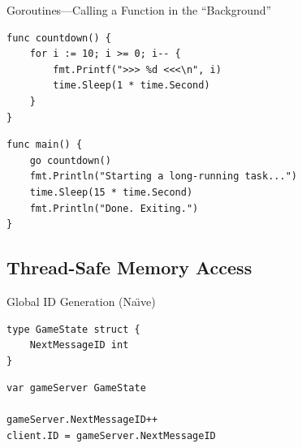 \documentclass[pdf]{beamer}
\begin{document}
\begin{frame}[fragile]{Goroutines---Calling a Function in the ``Background''}
\begin{lstlisting}
func countdown() {
    for i := 10; i >= 0; i-- {
        fmt.Printf(">>> %d <<<\n", i)
        time.Sleep(1 * time.Second)
    }
}
\end{lstlisting}
\begin{lstlisting}
func main() {
    go countdown()
    fmt.Println("Starting a long-running task...")
    time.Sleep(15 * time.Second)
    fmt.Println("Done. Exiting.")
}
\end{lstlisting}
\end{frame}




\subsection{Thread-Safe Memory Access}
\begin{frame}[fragile]{Global ID Generation (Na\"\i ve)}
\begin{lstlisting}
type GameState struct {
    NextMessageID int
}
\end{lstlisting}
\pause
\begin{lstlisting}
var gameServer GameState

gameServer.NextMessageID++
client.ID = gameServer.NextMessageID
\end{lstlisting}
\end{frame}
\end{document}
